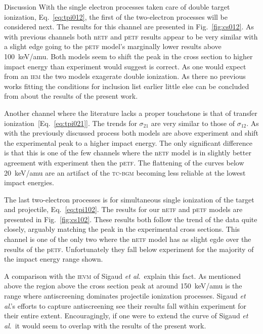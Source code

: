 \documentclass[aps, pra, reprint, groupedaddress, amsfonts,
               amsmath, amssymb, showpacs, nofootinbib]{revtex4-1}
\begin{document}
\begin{section}{Discussion \label{sec:disc}}
   With the single electron processes taken care of double target ionization, Eq.~\eqref{eq:tpi012},
   the first of the two-electron processes will be considered next. The results for this channel are
   presented in Fig.~\ref{fig:cs012}. As with previous channels both n\textsc{etf} and p\textsc{etf}
   results appear to be very similar with a slight edge going to the p\textsc{etf} model's marginally
   lower results above 100~keV/amu. Both models seem to shift the peak in the cross section to higher
   impact energy than experiment would suggest is correct. As one would expect from an \textsc{iem}
   the two models exagerate double ionization. As there no previous works fitting the conditions for
   inclusion list earlier little else can be concluded from about the results of the present work.

   Another channel where the literature lacks a proper touchstone is that of transfer ionization\
   [Eq.~\eqref{eq:tpi021}]. The trends for $\sigma_{21}$ are very similar to those of $\sigma_{12}$.
   As with the previously discussed process both models are above experiment and shift the experimental
   peak to a higher impact energy. The only significant difference is that this is one of the few
   channels where the n\textsc{etf} model is in slightly better agreement with experiment then the
   p\textsc{etf}. The flattening of the curves below 20~keV/amu are an artifact of the \textsc{tc-bgm}
   becoming less reliable at the lowest impact energies.

   The last two-electron processes is for simultaneous single ionization of the target and projectile,
   Eq.~\eqref{eq:tpi102}. The results for our n\textsc{etf} and p\textsc{etf} models are presented in
   Fig.~\ref{fig:cs102}. These results both follow the trend of the data quite closely, arguably
   matching the peak in the experimental cross sections. This channel is one of the only two where
   the n\textsc{etf} model has as slight egde over the results of the p\textsc{etf}. Unfortunately they
   fall below experiment for the majority of the impact energy range shown.

   A comparison with the \textsc{ievm} of Sigaud \textit{et al}.\ explain this fact. As mentioned above
   the region above the cross section peak at around 150~keV/amu is the range where antiscreening
   dominates projectile ionization processes. Sigaud \textit{et al}.'s efforts to capture antiscreening
   see their results fall within experiment for their entire extent. Encouragingly, if one were to
   extend the curve of Sigaud \textit{et al}.\ it would seem to overlap with the results of the present
   work.


\end{section}
\end{document}
